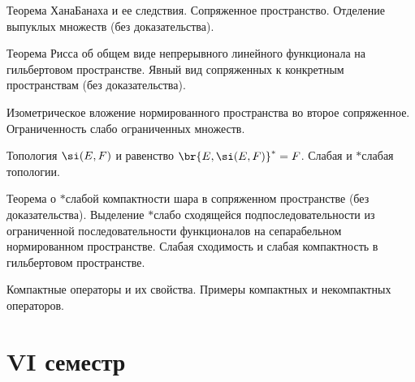 \documentclass[a4paper]{article}
\begin{document}
\begin{nums}{-2}
\item Теорема Хана\ч Банаха и ее следствия. Сопряженное пространство. Отделение выпуклых множеств (без доказательства).
\item Теорема Рисса об общем виде непрерывного линейного функционала на гильбертовом пространстве. Явный вид сопряженных
      к конкретным пространствам (без доказательства).
\item Изометрическое вложение нормированного пространства во второе сопряженное. Ограниченность слабо ограниченных множеств.
\item Топология $\si(E,F)$ и равенство $\br{E, \si(E,F)}^* = F$. Слабая и $*$\д слабая топологии.
\item Теорема о $*$\д слабой компактности шара в сопряженном пространстве (без доказательства).
      Выделение $*$\д слабо сходящейся подпоследовательности из ограниченной последовательности
      функционалов на сепарабельном нормированном пространстве.
      Слабая сходимость и слабая компактность в гильбертовом пространстве.
\item Компактные операторы и их свойства. Примеры компактных и некомпактных операторов.
\end{nums}

\medskip\dmvntrail

\pagebreak

\section*{VI семестр}
\end{document}
